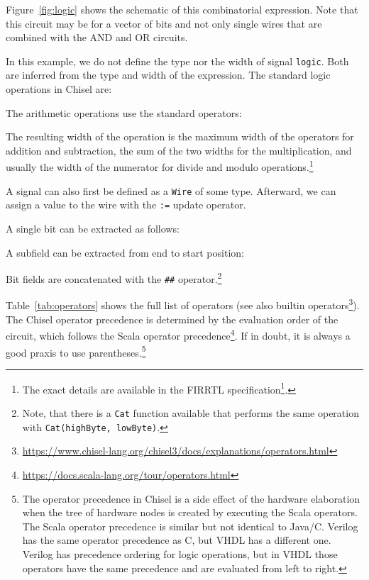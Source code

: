 \documentclass[%
    10pt,
    headinclude, footexclude,
    openright, %
    notitlepage,
    cleardoubleempty,
    headsepline,
    pointlessnumbers,
    bibtotoc, idxtotoc,
    ]{scrbook}
\newcommand{\code}[1]{{\small{\texttt{#1}}}}
\newcommand{\codefoot}[1]{{\footnotesize{\texttt{#1}}}}
\newcommand{\myref}[2]{\href{#1}{#2}}
\renewcommand{\myref}[2]{{#2}{\footnote{\url{#1}}}}
\begin{document}
Figure~\ref{fig:logic} shows the schematic of this combinatorial expression.
Note that this circuit may be for a vector of bits and not only single wires
that are combined with the AND and OR circuits.

In this example, we do not define the type nor the width of signal \code{logic}.
Both are inferred from the type and width of the expression.
The standard logic operations in Chisel are:



\noindent The arithmetic operations use the standard operators:



\noindent The resulting width of the operation is the maximum width of the operators for
addition and subtraction, the sum of the two widths for the multiplication, and usually
the width of the numerator for divide and modulo operations.\footnote{The exact
details are available in the \myref{https://github.com/freechipsproject/firrtl/blob/master/spec/spec.pdf}{FIRRTL specification}.}

A signal can also first be defined as a \code{Wire} of some type. Afterward, we can assign a
value to the wire with the \code{:=} update operator.


A single bit can be extracted as follows:

\noindent A subfield can be extracted from end to start position:

\noindent Bit fields are concatenated with the \code{\#\#} operator.\footnote{Note, that there is a \codefoot{Cat} function available that performs the same
operation with \codefoot{Cat(highByte, lowByte)}.}


Table~\ref{tab:operators} shows the full list of operators
(see also \myref{https://www.chisel-lang.org/chisel3/docs/explanations/operators.html}{builtin operators}).
The Chisel operator precedence is determined by the evaluation order of the circuit,
which follows the \myref{https://docs.scala-lang.org/tour/operators.html}{Scala operator precedence}.
If in doubt, it is always a good praxis to use parentheses.\footnote{The operator precedence in
Chisel is a side effect of the hardware elaboration when the tree of hardware nodes
is created by executing the Scala operators. The Scala operator precedence is similar but
not identical to Java/C. Verilog has the same operator precedence as C, but VHDL
has a different one. Verilog has precedence ordering for logic operations, but in VHDL
those operators have the same precedence and are evaluated from left to right.}
\end{document}
